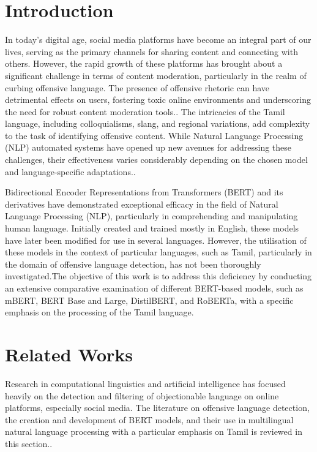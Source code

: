 \documentclass{svproc}
\begin{document}
\section{Introduction}

In today's digital age, social media platforms have become an integral part of our lives, serving as the primary channels for sharing content and connecting with others. However, the rapid growth of these platforms has brought about a significant challenge in terms of content moderation, particularly in the realm of curbing offensive language. The presence of offensive rhetoric can have detrimental effects on users, fostering toxic online environments and underscoring the need for robust content moderation tools.\cite{palanikumar2023development}. The intricacies of the Tamil language, including colloquialisms, slang, and regional variations, add complexity to the task of identifying offensive content. While Natural Language Processing (NLP) automated systems have opened up new avenues for addressing these challenges, their effectiveness varies considerably depending on the chosen model and language-specific adaptations.\cite{anand2023deep}.

Bidirectional Encoder Representations from Transformers (BERT) and its derivatives have demonstrated exceptional efficacy in the field of Natural Language Processing (NLP), particularly in comprehending and manipulating human language. Initially created and trained mostly in English, these models have later been modified for use in several languages. However, the utilisation of these models in the context of particular languages, such as Tamil\cite{balakrishnan2023tamil}, particularly in the domain of offensive language detection, has not been thoroughly investigated.The objective of this work is to address this deficiency by conducting an extensive comparative examination of different BERT-based models, such as mBERT, BERT Base and Large, DistilBERT, and RoBERTa, with a specific emphasis on the processing of the Tamil language. 

\section{Related Works}

Research in computational linguistics and artificial intelligence has focused heavily on the detection and filtering of objectionable language on online platforms, especially social media\cite{jothi2023}. The literature on offensive language detection, the creation and development of BERT models, and their use in multilingual natural language processing with a particular emphasis on Tamil is reviewed in this section.\cite{chakravarthi2023detecting}.
\end{document}
